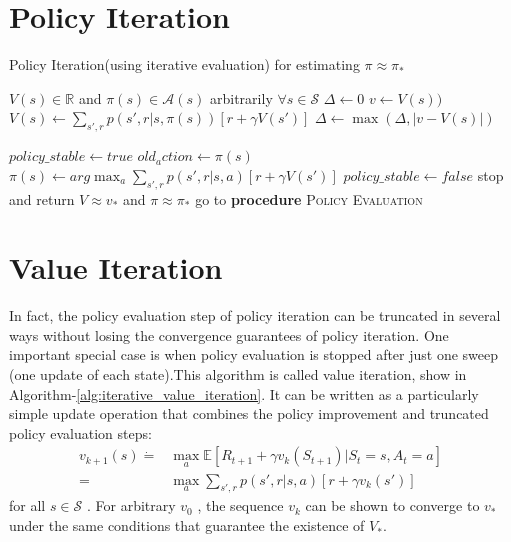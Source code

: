 \section{Policy Iteration}
\begin{algorithm}[H]
\label{alg:policy_iteration}
\caption{Policy Iteration(using iterative evaluation) for estimating $\pi \approx \pi_*$}
\begin{algorithmic}[1]
	\State $V(s) \in \mathbb{R}$ and $\pi(s) \in \mathcal{A}(s)$ arbitrarily $\forall s \in \mathcal{S}$
\EndProcedure
\Statex
{}
\label{proc:policy_evaluation}
\Repeat
	\State $\Delta \leftarrow 0$
			\State $v \leftarrow V(s))$
		\State $V(s) \leftarrow \sum_{s',r}p(s',r|s, \pi(s))[r+\gamma V(s')]$
		\State $\Delta \leftarrow \max(\Delta, |v-V(s)|)$
	\EndFor
\Until{\begin{math} \Delta < \theta \end{math}}
\EndProcedure

\Statex
{}
\State $policy\_stable \leftarrow true$
\State $old_action \leftarrow \pi(s)$
\State $\pi(s) \leftarrow arg \max_{a} \sum_{s',r}p(s',r|s,a)[r+\gamma V(s')]$
	\State $policy\_stable \leftarrow false$
\EndIf
\EndFor
{}
	\State stop and return $V \approx v_*$ and $\pi \approx \pi_*$
\Else
	\State go to \textbf{procedure} \textsc{Policy Evaluation}
\EndIf
\EndProcedure
\end{algorithmic}
\end{algorithm}

\section{Value Iteration}
In fact, the policy evaluation step of policy iteration can be truncated in several ways without losing the convergence guarantees of policy iteration. One important special case is when policy evaluation is stopped after just one sweep (one update of each state).This algorithm is called value iteration, show in Algorithm-\ref{alg:iterative_value_iteration}. It can be written as a particularly simple update operation that combines the policy improvement and truncated policy evaluation steps:
\begin{equation}
\begin{split}
	v_{k+1}(s) \dot{=} & \max_a \mathbb{E}[R_{t+1}+\gamma v_k(S_{t+1})|S_t=s,A_t=a] \\
		= & \max_{a} \sum_{s',r}p(s',r|s,a)[r+\gamma v_k(s')]
\end{split}
\end{equation}
for all $s \in \mathcal{S}$ . For arbitrary $v_0$ , the sequence ${v_k}$ can be shown to converge to $v_*$ under
the same conditions that guarantee the existence of $V_*$.


